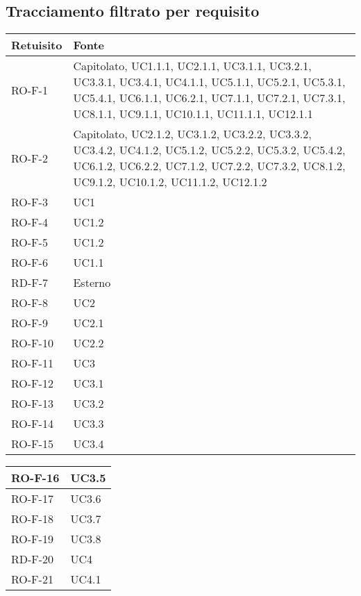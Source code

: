 \subsection{Tracciamento filtrato per requisito}
\begin{center}
\renewcommand{\arraystretch}{1.8} %
\begin{tabular}{ |m{8em}|m{13em}| }
    \hline
    \textbf{Retuisito} & \textbf{Fonte} \\
    \hline
    RO-F-1  &   Capitolato, UC1.1.1, UC2.1.1, UC3.1.1, UC3.2.1, UC3.3.1, UC3.4.1, UC4.1.1, UC5.1.1, UC5.2.1, UC5.3.1, UC5.4.1, UC6.1.1, UC6.2.1, UC7.1.1, UC7.2.1, UC7.3.1, UC8.1.1, UC9.1.1, UC10.1.1, UC11.1.1, UC12.1.1 \\
    \hline
    RO-F-2  &   Capitolato, UC2.1.2, UC3.1.2, UC3.2.2, UC3.3.2, UC3.4.2, UC4.1.2, UC5.1.2, UC5.2.2, UC5.3.2, UC5.4.2, UC6.1.2, UC6.2.2, UC7.1.2, UC7.2.2, UC7.3.2, UC8.1.2, UC9.1.2, UC10.1.2, UC11.1.2, UC12.1.2 \\
    \hline
    RO-F-3  &   UC1 \\
    \hline
    RO-F-4  &   UC1.2 \\
    \hline
    RO-F-5  &   UC1.2 \\
    \hline
    RO-F-6  &   UC1.1 \\
    \hline
    RD-F-7  &   Esterno \\
    \hline
    RO-F-8  &   UC2 \\
    \hline
    RO-F-9  &   UC2.1 \\
    \hline
    RO-F-10  &  UC2.2 \\
    \hline
    RO-F-11  &  UC3 \\
    \hline
    RO-F-12  &  UC3.1 \\
    \hline
    RO-F-13  &  UC3.2 \\
    \hline
    RO-F-14  &  UC3.3 \\
    \hline
    RO-F-15  &  UC3.4 \\
    \hline
    \end{tabular}
    \newpage
    \begin{tabular}{ |m{8em}|m{13em}| }
    \hline
    RO-F-16  &  UC3.5 \\
    \hline
    RO-F-17  &  UC3.6 \\
    \hline
    RO-F-18  &  UC3.7 \\
    \hline
    RO-F-19  &  UC3.8 \\
    \hline
    RD-F-20  &  UC4 \\
    \hline
    RO-F-21  &  UC4.1 \\

\end{tabular}
\end{center}
